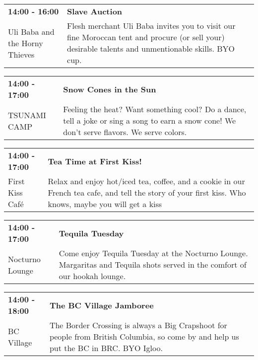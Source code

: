 \begin{tabular}{ p{1in} p{2.2in} }
    \textbf{14:00 - 16:00} & \textbf{Slave Auction} \\
    Uli Baba and the Horny Thieves \newline  & Flesh merchant Uli Baba invites you to visit our fine Moroccan tent
and procure (or sell your) desirable talents and unmentionable skills.
BYO cup. \\
    \hline 
\end{tabular}
    
\begin{tabular}{ p{1in} p{2.2in} }
    \textbf{14:00 - 17:00} & \textbf{Snow Cones in the Sun} \\
    TSUNAMI CAMP \newline  & Feeling the heat?  Want something cool?
Do a dance, tell a joke or sing a song to earn a snow cone!  We don't serve flavors. We serve colors. \\
    \hline 
\end{tabular}
    
\begin{tabular}{ p{1in} p{2.2in} }
    \textbf{14:00 - 17:00} & \textbf{Tea Time at First Kiss!} \\
    First Kiss Caf\'e \newline  & Relax and enjoy hot/iced tea, coffee, and a cookie in our French tea cafe, and tell the story of your first kiss. Who knows, maybe you will get a kiss \\
    \hline 
\end{tabular}
    
\begin{tabular}{ p{1in} p{2.2in} }
    \textbf{14:00 - 17:00} & \textbf{Tequila Tuesday} \\
    Nocturno Lounge \newline  & Come enjoy Tequila Tuesday at the Nocturno Lounge.  Margaritas and Tequila shots served in the comfort of our hookah lounge. \\
    \hline 
\end{tabular}
    
\begin{tabular}{ p{1in} p{2.2in} }
    \textbf{14:00 - 18:00} & \textbf{The BC Village Jamboree} \\
    BC Village \newline  & The Border Crossing is always a Big Crapshoot for people from British Columbia, so come by and help us put the BC in BRC. BYO Igloo. \\
    \hline 
\end{tabular}
    
